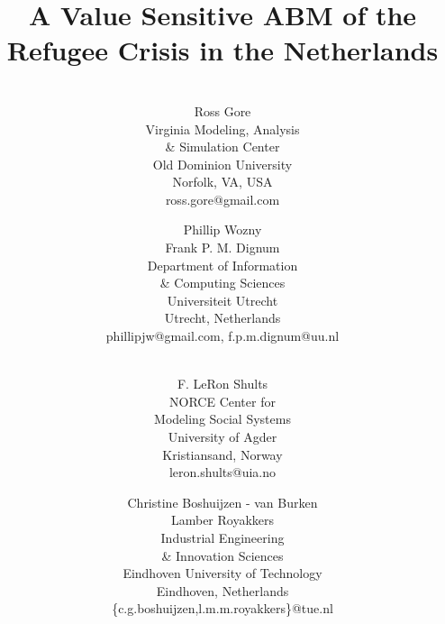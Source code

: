 \documentclass{scspaperproc}
\theoremstyle{scsthe}
\begin{document}
\title{A Value Sensitive ABM of the Refugee Crisis in the Netherlands}

\author{
\\%
Ross Gore \\ [12pt]
Virginia Modeling, Analysis \\ \& Simulation Center \\
Old Dominion University \\
Norfolk, VA, USA \\
ross.gore@gmail.com\\
\and
Phillip Wozny \\
Frank P. M. Dignum \\ [12pt]
Department of Information \\ \& Computing Sciences \\
Universiteit Utrecht \\
Utrecht, Netherlands \\
phillipjw@gmail.com, f.p.m.dignum@uu.nl \\
\and
\\%
F. LeRon Shults \\ [12pt]
NORCE Center for \\ Modeling Social Systems \\
University of Agder \\
Kristiansand, Norway \\
leron.shults@uia.no \\
\and
Christine Boshuijzen - van Burken \\ 
Lamber Royakkers \\ [12pt]
Industrial Engineering \\ \& Innovation Sciences \\
Eindhoven University of Technology \\
Eindhoven, Netherlands \\
\{c.g.boshuijzen,l.m.m.royakkers\}@tue.nl
}
\end{document}
